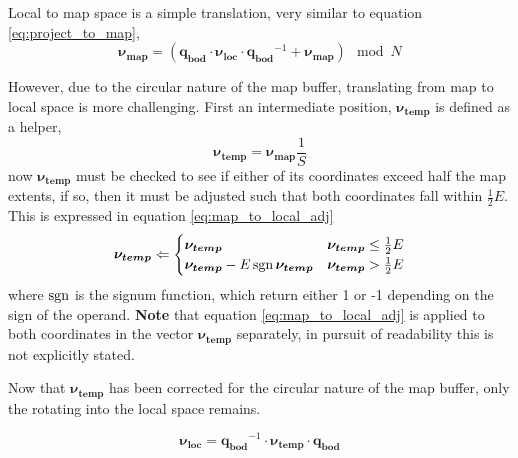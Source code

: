        Local to map space is a simple translation, very similar to equation \ref{eq:project_to_map},
        \begin{equation} \label{eq:local_to_map}
            \boldsymbol{\nu_{map}} = (\boldsymbol{q_{bod}} \cdot \boldsymbol{\nu_{loc}} \cdot \boldsymbol{q_{bod}}^{-1} + \boldsymbol{\nu_{map}}) \mod N
        \end{equation}

        However, due to the circular nature of the map buffer, translating from map to local space is more challenging. First an intermediate position, \(\boldsymbol{\nu_{temp}}\) is defined as a helper,
        \begin{equation} \label{eq:map_to_local_help}
            \boldsymbol{\nu_{temp}} = \boldsymbol{\nu_{map}}\frac{1}{S}
        \end{equation}
        now \(\boldsymbol{\nu_{temp}}\) must be checked to see if either of its coordinates exceed half the map extents, if so, then it must be adjusted such that both coordinates fall within \(\frac{1}{2}E\).
        This is expressed in equation \ref{eq:map_to_local_adj}
        \begin{equation} \label{eq:map_to_local_adj}
            \boldsymbol{\nu_{temp}} \Leftarrow 
            \begin{cases}
                \boldsymbol{\nu_{temp}} & \boldsymbol{\nu_{temp}} \leq \frac{1}{2}E \\
                \boldsymbol{\nu_{temp}} - E\operatorname{\boldsymbol{sgn}} \boldsymbol{\nu_{temp}} & \boldsymbol{\nu_{temp}} > \frac{1}{2}E
            \end{cases}
        \end{equation}
        where \(\operatorname{\boldsymbol{sgn}}\) is the signum function, which return either 1 or -1 depending on the sign of the operand. 
        \textbf{Note} that equation \ref{eq:map_to_local_adj} is applied to both coordinates in the vector \(\boldsymbol{\nu_{temp}}\) separately, in pursuit of readability this is not explicitly stated.

        Now that \(\boldsymbol{\nu_{temp}}\) has been corrected for the circular nature of the map buffer, only the rotating into the local space remains.

        \begin{equation} \label{eq:map_to_local_rot}
            \boldsymbol{\nu_{loc}} = \boldsymbol{q_{bod}}^{-1} \cdot \boldsymbol{\nu_{temp}} \cdot \boldsymbol{q_{bod}}
        \end{equation}


